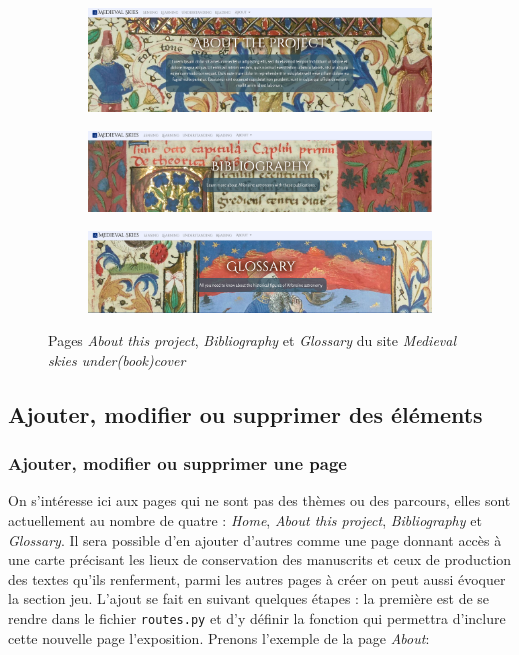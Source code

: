    \begin{figure}[!h]
    \centering
    \begin{subfigure}[h]{0.5\textwidth}
        \includegraphics[width=\textwidth]{images/partie3/website/expo-about.png}
    \end{subfigure}
    \begin{subfigure}[h]{0.5\textwidth}
        \includegraphics[width=\textwidth]{images/partie3/website/expo-bibliography.png}
    \end{subfigure}
    \begin{subfigure}[h]{0.5\textwidth}
        \includegraphics[width=\textwidth]{images/partie3/website/expo-glossary.png}
    \end{subfigure}
    \caption{Pages \textit{About this project}, \textit{Bibliography} et \textit{Glossary} du site \textit{Medieval skies under(book)cover}}
    \end{figure}

    \subsection{Ajouter, modifier ou supprimer des éléments}
    
    \subsubsection{Ajouter, modifier ou supprimer une page}
    On s'intéresse ici aux pages qui ne sont pas des thèmes ou des parcours, elles sont actuellement au nombre de quatre : \textit{Home}, \textit{About this project}, \textit{Bibliography} et \textit{Glossary}. Il sera possible d'en ajouter d'autres comme une page donnant accès à une carte précisant les lieux de conservation des manuscrits et ceux de production des textes qu'ils renferment, parmi les autres pages à créer on peut aussi évoquer la section jeu. L'ajout se fait en suivant quelques étapes : la première est de se rendre dans le fichier \texttt{routes.py} et d'y définir la fonction qui permettra d'inclure cette nouvelle page l'exposition. Prenons l'exemple de la page \textit{About}: 
    
